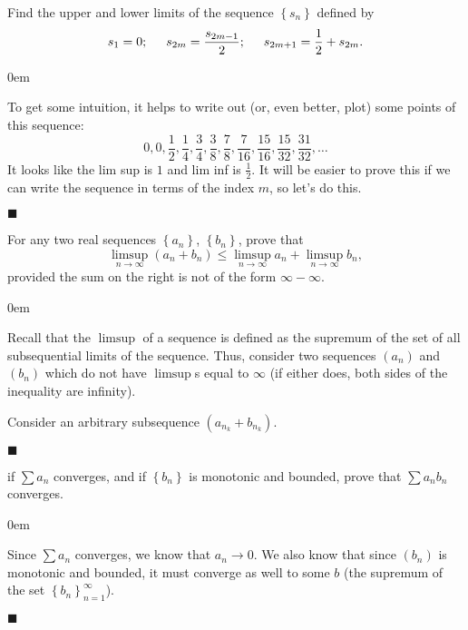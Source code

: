 \documentclass[12pt]{article}
\renewcommand{\qed}{\hfill$\blacksquare$}
\renewenvironment{proof}{\begin{addmargin}[1em]{0em}\begin{newproof}}{\end{newproof}\end{addmargin}\qed}
\newenvironment{problem}[2][Exercise]{\begin{trivlist}
\item[\hskip \labelsep {\bfseries #1}\hskip \labelsep {\bfseries #2.}]}{\end{trivlist}}
\begin{document}
\begin{problem}{3.4}
Find the upper and lower limits of the sequence $\left\{s_n\right\}$ defined by $$ s_1=0; \hspace{5mm} s_{2m} = \frac{s_{2m-1}}{2}; \hspace{5mm} s_{2m+1} = \frac{1}{2}+s_{2m}.$$
\end{problem}
\begin{proof}
To get some intuition, it helps to write out (or, even better, plot) some points of this sequence: $$ 0, 0, \frac{1}{2}, \frac{1}{4}, \frac{3}{4}, \frac{3}{8}, \frac{7}{8}, \frac{7}{16}, \frac{15}{16}, \frac{15}{32}, \frac{31}{32},\ldots   $$ It looks like the lim sup is $1$ and lim inf is $\frac{1}{2}$. It will be easier to prove this if we can write the sequence in terms of the index $m$, so let's do this. 
\end{proof}




\begin{problem}{3.5}
For any two real sequences $\left\{a_n\right\}$, $\left\{b_n\right\}$, prove that $$ \limsup_{n\rightarrow \infty} \left(a_n + b_n\right) \leq \limsup_{n\rightarrow \infty} a_n + \limsup_{n\rightarrow \infty} b_n, $$ provided the sum on the right is not of the form $\infty - \infty$.
\end{problem}
\begin{proof}
Recall that the $\limsup$ of a sequence is defined as the supremum of the set of all subsequential limits of the sequence. Thus, consider two sequences $\left(a_n\right)$ and $\left(b_n\right)$ which do not have $\limsup$s equal to $\infty$ (if either does, both sides of the inequality are infinity).

Consider an arbitrary subsequence $\left(a_{n_k}+b_{n_k}\right)$.
\end{proof}







\begin{problem}{3.8}
if $\sum a_n$ converges, and if $\left\{b_n\right\}$ is monotonic and bounded, prove that $\sum a_n b_n$ converges.
\end{problem}
\begin{proof}
Since $\sum a_n$ converges, we know that $a_n \rightarrow 0$. We also know that since $\left(b_n\right)$ is monotonic and bounded, it must converge as well to some $b$ (the supremum of the set $\left\{b_n\right\}_{n=1}^{\infty}$).
\end{proof}
\end{document}

